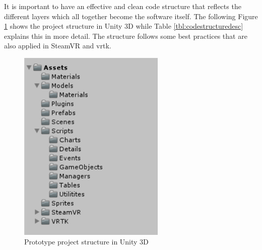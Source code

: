 It is important to have an effective and clean code structure that reflects the different layers which all together become the software itself. The following Figure \ref{fig:unitycodestructure} shows the project structure in Unity 3D while Table \ref{tbl:codestructuredesc} explains this in more detail. The structure follows some best practices that are also applied in SteamVR and \gls{vrtk}.
\begin{figure}[h]
	\begin{center}
		\includegraphics[width=7cm]{03_Figures/08_Development/CodeStructure.png}
		\caption{Prototype project structure in Unity 3D}
		\label{fig:unitycodestructure}
	\end{center}
\end{figure}


